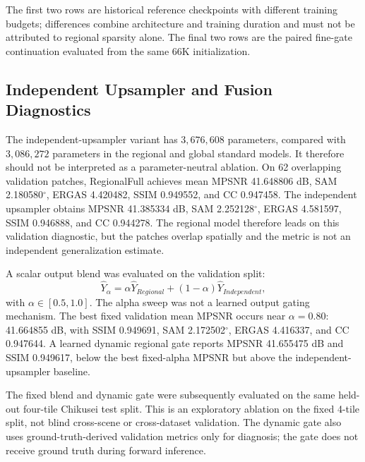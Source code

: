 \documentclass[10pt,twocolumn,letterpaper]{article}
\begin{document}
The first two rows are historical reference checkpoints with different training budgets; differences combine architecture and training duration and must not be attributed to regional sparsity alone. The final two rows are the paired fine-gate continuation evaluated from the same 66K initialization.

\subsection{Independent Upsampler and Fusion Diagnostics}

The independent-upsampler variant has $3{,}676{,}608$ parameters, compared with $3{,}086{,}272$ parameters in the regional and global standard models. It therefore should not be interpreted as a parameter-neutral ablation. On 62 overlapping validation patches, RegionalFull achieves mean MPSNR 41.648806 dB, SAM 2.180580$^\circ$, ERGAS 4.420482, SSIM 0.949552, and CC 0.947458. The independent upsampler obtains MPSNR 41.385334 dB, SAM 2.252128$^\circ$, ERGAS 4.581597, SSIM 0.946888, and CC 0.944278. The regional model therefore leads on this validation diagnostic, but the patches overlap spatially and the metric is not an independent generalization estimate.

A scalar output blend was evaluated on the validation split:
\begin{equation}
    \hat{Y}_{\alpha}=\alpha\hat{Y}_{Regional}+(1-\alpha)\hat{Y}_{Independent},
\end{equation}
with $\alpha \in [0.5,1.0]$. The alpha sweep was not a learned output gating mechanism. The best fixed validation mean MPSNR occurs near $\alpha=0.80$: 41.664855 dB, with SSIM 0.949691, SAM 2.172502$^\circ$, ERGAS 4.416337, and CC 0.947644. A learned dynamic regional gate reports MPSNR 41.655475 dB and SSIM 0.949617, below the best fixed-alpha MPSNR but above the independent-upsampler baseline.

The fixed blend and dynamic gate were subsequently evaluated on the same held-out four-tile Chikusei test split. This is an exploratory ablation on the fixed 4-tile split, not blind cross-scene or cross-dataset validation. The dynamic gate also uses ground-truth-derived validation metrics only for diagnosis; the gate does not receive ground truth during forward inference.
\end{document}
